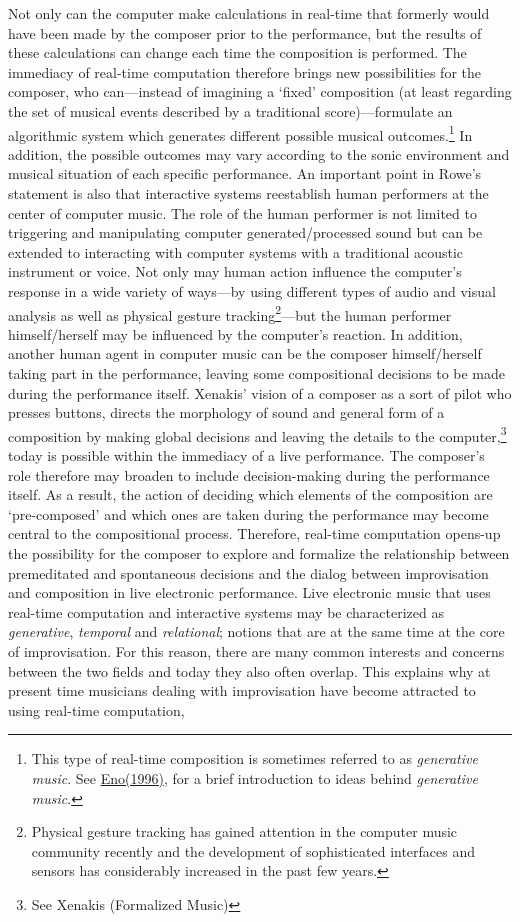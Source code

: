 Not only can the computer make calculations in real-time that formerly would have been made by the composer prior to the performance, but the results of these calculations can change each time the composition is performed. The immediacy of real-time computation therefore brings new possibilities for the composer, who can---instead of imagining a `fixed' composition (at least regarding the set of musical events described by a traditional score)---formulate an algorithmic system which generates different possible musical outcomes.\footnote{This type of real-time composition is sometimes referred to as \emph{generative music}. See \hyperlink{eno}{Eno(1996)}, for a brief introduction to ideas behind \emph{generative music}.} In addition, the possible outcomes may vary according to the sonic environment and musical situation of each specific performance. An important point in Rowe's statement is also that interactive systems reestablish human performers at the center of computer music. The role of the human performer is not limited to triggering and manipulating computer generated/processed sound but can be extended to interacting with computer systems with a traditional acoustic instrument or voice. Not only may human action influence the computer's response in a wide variety of ways---by using different types of audio and visual analysis as well as physical gesture tracking\footnote{Physical gesture tracking has gained attention in the computer music community recently and the development of sophisticated interfaces and sensors has considerably increased in the past few years.}---but the human performer himself/herself may be influenced by the computer's reaction. In addition, another human agent in computer music can be the composer himself/herself taking part in the performance, leaving some compositional decisions to be made during the performance itself. Xenakis' vision of a composer as a sort of pilot who presses buttons, directs the morphology of sound and general form of a composition by making global decisions and leaving the details to the computer,\footnote{See Xenakis (Formalized Music)} today is possible within the immediacy of a live performance. The composer's role therefore may broaden to include decision-making during the performance itself. As a result, the action of deciding which elements of the composition are `pre-composed' and which ones are taken during the performance may become central to the compositional process. Therefore, real-time computation opens-up the possibility for the composer to explore and formalize the relationship between premeditated and spontaneous decisions and the dialog between improvisation and composition in live electronic performance. Live electronic music that uses real-time computation and interactive systems may be characterized as \emph{generative}, \emph{temporal} and \emph{relational}; notions that are at the same time at the core of improvisation. For this reason, there are many common interests and concerns between the two fields and today they also often overlap. This explains why at present time musicians dealing with improvisation have become attracted to using real-time computation,
